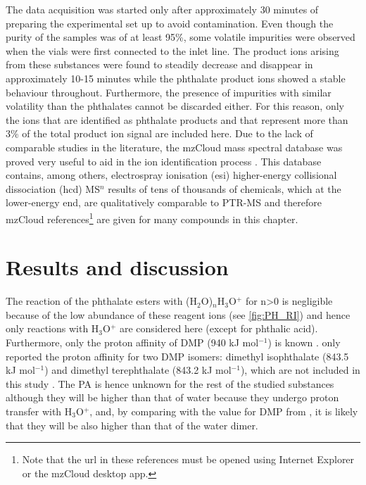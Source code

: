 The data acquisition was started only after approximately 30 minutes of preparing the experimental set up to avoid contamination.
%
Even though the purity of the samples was of at least 95\%, some volatile impurities were observed when the vials were first connected to the inlet line.
%
The product ions arising from these substances were found to steadily decrease and disappear in approximately 10-15 minutes while the phthalate product ions showed a stable behaviour throughout.
%
Furthermore, the presence of impurities with similar volatility than the phthalates cannot be discarded either. 
%
For this reason, only the  ions that are identified as phthalate products and that represent more than 3\% of the total product ion signal are included here.
%
Due to the lack of comparable studies in the literature, the mzCloud mass spectral database was proved very useful to aid in the ion identification process \cite{mzcloudd}.
%
 This database contains, among others, electrospray ionisation (\acrshort{esi}) higher-energy collisional dissociation (\acrshort{hcd}) MS$^n$ results of tens of thousands of chemicals, which at the lower-energy end,  are qualitatively comparable to PTR-MS and therefore mzCloud references\footnote{Note that the url in these references must be opened using Internet Explorer or the mzCloud desktop app.}  are given for many compounds in this chapter.
 







\section{Results and discussion}
The reaction of the phthalate esters with (H$_2$O)$_n$H$_3$O$^+$ for n>0 is negligible because of the low abundance of these reagent ions (see \autoref{fig:PH_RI}) and hence only reactions with H$_3$O$^+$ are considered here (except for phthalic acid).
%
Furthermore, only the proton affinity of DMP (940 kJ mol$^{-1}$) %
is known  \cite{michalczuk2019isomer}. 
%
\citeauthor{doi:10.1063/1.556018}  only reported the proton affinity for two DMP isomers: dimethyl isophthalate (843.5 kJ mol$^{-1}$) and dimethyl terephthalate (843.2 kJ mol$^{-1}$), which are not included in this study \cite{doi:10.1063/1.556018}.
%
The PA is hence unknown for the rest of the studied substances although they will  be higher than that of water because they undergo proton transfer with H$_3$O$^+$, and, by comparing with the value for DMP from \citeauthor{michalczuk2019isomer}, it is likely that they will be also higher than that of the water dimer.
 
